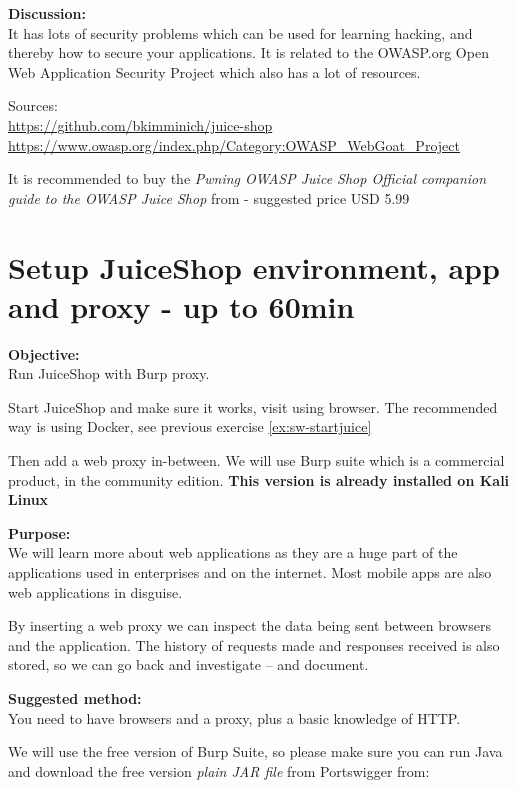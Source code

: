 \documentclass[a4paper,11pt,notitlepage]{report}
\begin{document}
{\bf Discussion:}\\
It has lots of security problems which can be used for learning
hacking, and thereby how to secure your applications. It is  related
to the OWASP.org Open Web Application Security Project which also has a
lot of resources.

Sources:\\
\url{https://github.com/bkimminich/juice-shop}\\
\url{https://www.owasp.org/index.php/Category:OWASP_WebGoat_Project}

It is recommended to buy the \emph{Pwning OWASP Juice Shop Official companion guide to the OWASP Juice Shop} from  - suggested price USD 5.99



\chapter{Setup JuiceShop environment, app and proxy - up to 60min}
\label{ex:js-burp}

{\bf Objective:}\\
Run JuiceShop with Burp proxy.

Start JuiceShop and make sure it works, visit using browser. The recommended way is using Docker, see previous exercise \ref{ex:sw-startjuice}

Then add a web proxy in-between. We will use Burp suite which is a commercial product, in the community edition. {\bf This version is already installed on Kali Linux}

{\bf Purpose:}\\
We will learn more about web applications as they are a huge part of the applications used in enterprises and on the internet. Most mobile apps are also web applications in disguise.

By inserting a web proxy we can inspect the data being sent between browsers and the application. The history of requests made and responses received is also stored, so we can go back and investigate -- and document.

{\bf Suggested method:}\\
You need to have browsers and a proxy, plus a basic knowledge of HTTP.

We will use the free version of Burp Suite, so please make sure you can run Java and
download the free version \emph{plain JAR file} from Portswigger from:

\end{document}
